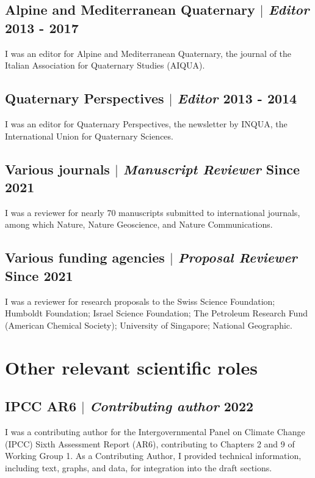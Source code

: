 \documentclass[11pt]{article}
\begin{document}
\subsection{Alpine and Mediterranean Quaternary  $|$ {\normalfont\textit{Editor}} \hfill 2013 - 2017}
{\footnotesize I was an editor for Alpine and Mediterranean Quaternary, the journal of the Italian Association for Quaternary Studies (AIQUA).}
\bigskip

\subsection{Quaternary Perspectives  $|$ {\normalfont\textit{Editor}} \hfill 2013 - 2014}
{\footnotesize I was an editor for Quaternary Perspectives, the newsletter by INQUA, the International Union for Quaternary Sciences.}
\bigskip

\subsection{Various journals  $|$ {\normalfont\textit{Manuscript Reviewer}} \hfill Since 2021}
{\footnotesize I was a reviewer for nearly 70 manuscripts submitted to international journals, among which Nature, Nature Geoscience, and Nature Communications.}
\bigskip

\subsection{Various funding agencies  $|$ {\normalfont\textit{Proposal Reviewer}} \hfill Since 2021}
{\footnotesize I was a reviewer for research proposals to the Swiss Science Foundation; Humboldt Foundation; Israel Science Foundation; The Petroleum Research Fund (American Chemical Society); University of Singapore; National Geographic.}
\bigskip

\section{Other relevant scientific roles}
\bigskip
\subsection{IPCC AR6  $|$ {\normalfont\textit{Contributing author}} \hfill 2022}
{\footnotesize I was a contributing author for the Intergovernmental Panel on Climate Change (IPCC) Sixth Assessment Report (AR6), contributing to Chapters 2 and 9 of Working Group 1. As a Contributing Author, I provided technical information, including text, graphs, and data, for integration into the draft sections.}
\end{document}
